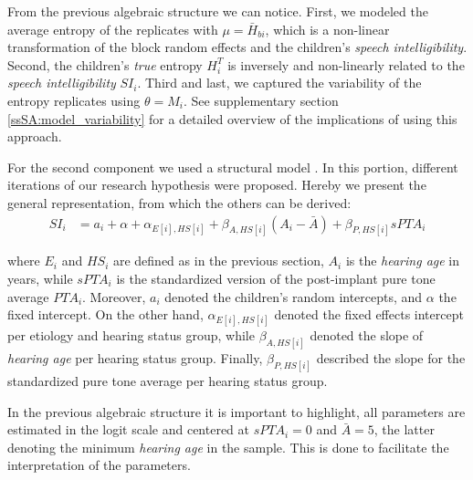 From the previous algebraic structure we can notice. First, we modeled the average entropy of the replicates with $\mu = \bar{H}_{bi}$, which is a non-linear transformation of the block random effects and the children's \textit{speech intelligibility}. Second, the children's \textit{true} entropy $H^{T}_{i}$ is inversely and non-linearly related to the \textit{speech intelligibility} $SI_{i}$. Third and last, we captured the variability of the entropy replicates using $\theta = M_{i}$. See supplementary section \ref{ssSA:model_variability} for a detailed overview of the implications of using this approach.

For the second component we used a structural model \cite{Hoyle_et_al_2014}. In this portion, different iterations of our research hypothesis were proposed. Hereby we present the general representation, from which the others can be derived:
%
\begin{align}
	SI_{i} & = a_{i} + \alpha + \alpha_{E[i], HS[i]} + \beta_{A, HS[i]} (A_{i} - \bar{A}) + \beta_{P, HS[i]} sPTA_{i} 
\end{align}

\noindent where $E_{i}$ and $HS_{i}$ are defined as in the previous section, $A_{i}$ is the \textit{hearing age} in years, while $sPTA_{i}$ is the standardized version of the post-implant pure tone average $PTA_{i}$. Moreover, $a_{i}$ denoted the children's random intercepts, and $\alpha$ the fixed intercept. On the other hand,  $\alpha_{E[i],HS[i]}$ denoted the fixed effects intercept per etiology and hearing status group, while $\beta_{A, HS[i]}$ denoted the slope of \textit{hearing age} per hearing status group. Finally, $\beta_{P, HS[i]}$ described the slope for the standardized pure tone average per hearing status group. 

In the previous algebraic structure it is important to highlight, all parameters are estimated in the logit scale and centered at $sPTA_{i}=0$ and $\bar{A}=5$, the latter denoting the minimum \textit{hearing age} in the sample. This is done to facilitate the interpretation of the parameters.

